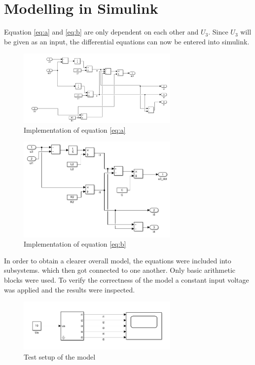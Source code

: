 \section{Modelling in Simulink}
Equation \ref{eq:a} and \ref{eq:b} are only dependent on each other and $U_3$. Since $U_3$ will be given as an input, the differential equations can now be entered into simulink.
\begin{figure}[H]
		\centering
		\includegraphics[width=0.7\textwidth]{figures/equation1.png}
		\caption{Implementation of equation \ref{eq:a}}
		\label{fig:equation1}
\end{figure}
\begin{figure}[H]
		\centering
		\includegraphics[width=0.7\textwidth]{figures/equation2.png}
		\caption{Implementation of equation \ref{eq:b}}
		\label{fig:equation2}
\end{figure}
In order to obtain a clearer overall model, the equations were included into subsystems. which then got connected to one another. Only basic arithmetic blocks were used. To verify the correctness of the model a constant input voltage was applied and the results were inspected. 
\begin{figure}[H]
		\centering
		\includegraphics[width=0.7\textwidth]{figures/testsetup.png}
		\caption{Test setup of the model}
		\label{fig:testsetup}
\end{figure}
